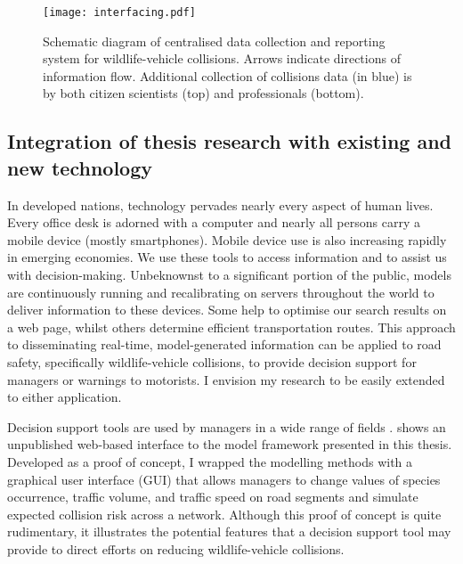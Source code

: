 \begin{figure*}[!h]
  \centering
  \texttt{[image: interfacing.pdf]}
  \caption[Centralised data collection and reporting system]{Schematic diagram of centralised data collection and reporting system for wildlife-vehicle collisions. Arrows indicate directions of information flow. Additional collection of collisions data (in blue) is by both citizen scientists (top) and professionals (bottom).}
  \label{wvc_server}
\end{figure*}

\subsection{Integration of thesis research with existing and new technology}

In developed nations, technology pervades nearly every aspect of human lives. Every office desk is adorned with a computer and nearly all persons carry a mobile device (mostly smartphones). Mobile device use is also increasing rapidly in emerging economies. We use these tools to access information and to assist us with decision-making. Unbeknownst to a significant portion of the public, models are continuously running and recalibrating on servers throughout the world to deliver information to these devices. Some help to optimise our search results on a web page, whilst others determine efficient transportation routes. This approach to disseminating real-time, model-generated information can be applied to road safety, specifically wildlife-vehicle collisions, to provide decision support for managers or warnings to motorists. I envision my research to be easily extended to either application.

Decision support tools are used by managers in a wide range of fields \citep{shim02}.  shows an unpublished web-based interface to the model framework presented in this thesis. Developed as a proof of concept, I wrapped the modelling methods with a graphical user interface (GUI) that allows managers to change values of species occurrence, traffic volume, and traffic speed on road segments and simulate expected collision risk across a network. Although this proof of concept is quite rudimentary, it illustrates the potential features that a decision support tool may provide to direct efforts on reducing wildlife-vehicle collisions.

